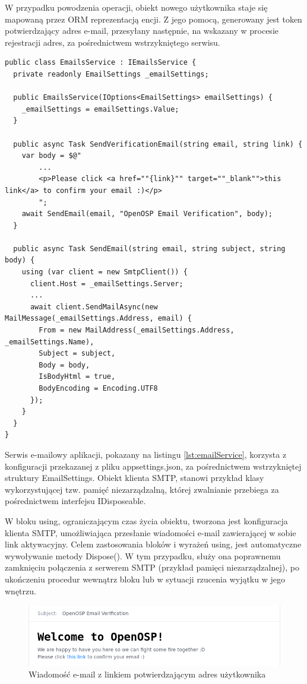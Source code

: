 W przypadku powodzenia operacji, obiekt nowego użytkownika staje się mapowaną przez ORM reprezentacją encji. Z jego pomocą, generowany jest token potwierdzający adres e-mail, przesyłany następnie, na wskazany w procesie rejestracji adres, za pośrednictwem wstrzykniętego serwisu.

\begin{lstlisting}[language=CSharp, caption={Fragment serwisu mailowego aplikacji serwerowej}, label=lst:emailService]
public class EmailsService : IEmailsService {
  private readonly EmailSettings _emailSettings;

  public EmailsService(IOptions<EmailSettings> emailSettings) {
    _emailSettings = emailSettings.Value;
  }

  public async Task SendVerificationEmail(string email, string link) {
    var body = $@"
        ...
        <p>Please click <a href=""{link}"" target=""_blank"">this link</a> to confirm your email :)</p>
        ";
    await SendEmail(email, "OpenOSP Email Verification", body);
  }

  public async Task SendEmail(string email, string subject, string body) {
    using (var client = new SmtpClient()) {
      client.Host = _emailSettings.Server;
      ...
      await client.SendMailAsync(new MailMessage(_emailSettings.Address, email) {
        From = new MailAddress(_emailSettings.Address, _emailSettings.Name),
        Subject = subject,
        Body = body,
        IsBodyHtml = true,
        BodyEncoding = Encoding.UTF8
      });
    }
  }
}
\end{lstlisting}

Serwis e-mailowy aplikacji, pokazany na listingu \ref{lst:emailService}, korzysta z konfiguracji przekazanej z pliku appsettings.json, za pośrednictwem wstrzykniętej struktury EmailSettings. Obiekt klienta SMTP, stanowi przykład klasy wykorzystującej tzw. pamięć niezarządzalną, której zwalnianie przebiega za pośrednictwem interfejsu IDisposeable.

W bloku using, ograniczającym czas życia obiektu, tworzona jest konfiguracja klienta SMTP, umożliwiająca przesłanie wiadomości e-mail zawierającej w sobie link aktywacyjny. Celem zastosowania bloków i wyrażeń using, jest automatyczne wywoływanie metody Dispose(). W tym przypadku, służy ona poprawnemu zamknięciu połączenia z serwerem SMTP (przykład pamięci niezarządzalnej), po ukończeniu procedur wewnątrz bloku lub w sytuacji rzucenia wyjątku w jego wnętrzu.

\begin{figure}[!htbp]
\centering
\includegraphics[width=\textwidth]{img/chapter5/email_content.png}
\caption{Wiadomość e-mail z linkiem potwierdzającym adres użytkownika}
\end{figure}

